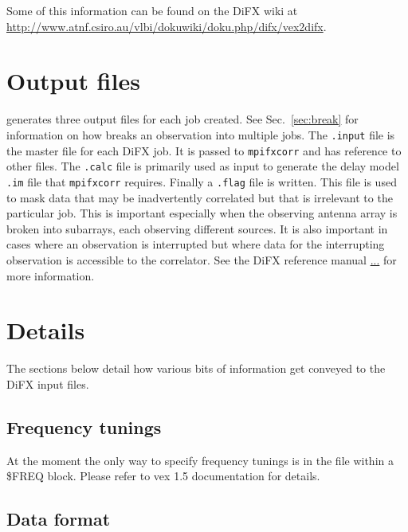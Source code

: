 \documentclass[12pt]{article}
\begin{document}
Some of this information can be found on the DiFX wiki at \url{http://www.atnf.csiro.au/vlbi/dokuwiki/doku.php/difx/vex2difx}.

\section{Output files}

\vexdifx generates three output files for each job created.
See Sec.~\ref{sec:break} for information on how \vexdifx breaks an observation into multiple jobs.
The {\tt .input} file is the master file for each DiFX job.
It is passed to {\tt mpifxcorr} and has reference to other files.
The {\tt .calc} file is primarily used as input to generate the delay model {\tt .im} file that {\tt mpifxcorr} requires.
Finally a {\tt .flag} file is written.
This file is used to mask data that may be inadvertently correlated but that is irrelevant to the particular job.
This is important especially when the observing antenna array is broken into subarrays, each observing different sources.
It is also important in cases where an observation is interrupted but where data for the interrupting observation is accessible to the correlator.
See the DiFX reference manual \url{...} for more information.

\section{Details}

The sections below detail how various bits of information get conveyed to the DiFX input files.

\subsection{Frequency tunings}

At the moment the only way to specify frequency tunings is in the \vx file within a \$FREQ block.
Please refer to vex 1.5 documentation for details.

\subsection{Data format}
\end{document}
